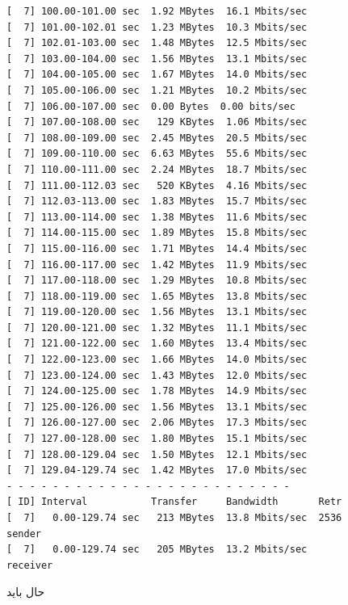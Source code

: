 \documentclass[12pt]{article}
\begin{document}
\begin{enumerate}
\begin{latin}
\begin{Verbatim}
[  7] 100.00-101.00 sec  1.92 MBytes  16.1 Mbits/sec                  
[  7] 101.00-102.01 sec  1.23 MBytes  10.3 Mbits/sec                  
[  7] 102.01-103.00 sec  1.48 MBytes  12.5 Mbits/sec                  
[  7] 103.00-104.00 sec  1.56 MBytes  13.1 Mbits/sec                  
[  7] 104.00-105.00 sec  1.67 MBytes  14.0 Mbits/sec                  
[  7] 105.00-106.00 sec  1.21 MBytes  10.2 Mbits/sec                  
[  7] 106.00-107.00 sec  0.00 Bytes  0.00 bits/sec                  
[  7] 107.00-108.00 sec   129 KBytes  1.06 Mbits/sec                  
[  7] 108.00-109.00 sec  2.45 MBytes  20.5 Mbits/sec                  
[  7] 109.00-110.00 sec  6.63 MBytes  55.6 Mbits/sec                  
[  7] 110.00-111.00 sec  2.24 MBytes  18.7 Mbits/sec                  
[  7] 111.00-112.03 sec   520 KBytes  4.16 Mbits/sec                  
[  7] 112.03-113.00 sec  1.83 MBytes  15.7 Mbits/sec                  
[  7] 113.00-114.00 sec  1.38 MBytes  11.6 Mbits/sec                  
[  7] 114.00-115.00 sec  1.89 MBytes  15.8 Mbits/sec                  
[  7] 115.00-116.00 sec  1.71 MBytes  14.4 Mbits/sec                  
[  7] 116.00-117.00 sec  1.42 MBytes  11.9 Mbits/sec                  
[  7] 117.00-118.00 sec  1.29 MBytes  10.8 Mbits/sec                  
[  7] 118.00-119.00 sec  1.65 MBytes  13.8 Mbits/sec                  
[  7] 119.00-120.00 sec  1.56 MBytes  13.1 Mbits/sec                  
[  7] 120.00-121.00 sec  1.32 MBytes  11.1 Mbits/sec                  
[  7] 121.00-122.00 sec  1.60 MBytes  13.4 Mbits/sec                  
[  7] 122.00-123.00 sec  1.66 MBytes  14.0 Mbits/sec                  
[  7] 123.00-124.00 sec  1.43 MBytes  12.0 Mbits/sec                  
[  7] 124.00-125.00 sec  1.78 MBytes  14.9 Mbits/sec                  
[  7] 125.00-126.00 sec  1.56 MBytes  13.1 Mbits/sec                  
[  7] 126.00-127.00 sec  2.06 MBytes  17.3 Mbits/sec                  
[  7] 127.00-128.00 sec  1.80 MBytes  15.1 Mbits/sec                  
[  7] 128.00-129.04 sec  1.50 MBytes  12.1 Mbits/sec                  
[  7] 129.04-129.74 sec  1.42 MBytes  17.0 Mbits/sec                  
- - - - - - - - - - - - - - - - - - - - - - - - -
[ ID] Interval           Transfer     Bandwidth       Retr
[  7]   0.00-129.74 sec   213 MBytes  13.8 Mbits/sec  2536             sender
[  7]   0.00-129.74 sec   205 MBytes  13.2 Mbits/sec                  receiver

\end{Verbatim}
\end{latin}

حال باید 

\end{enumerate}
\end{document}
